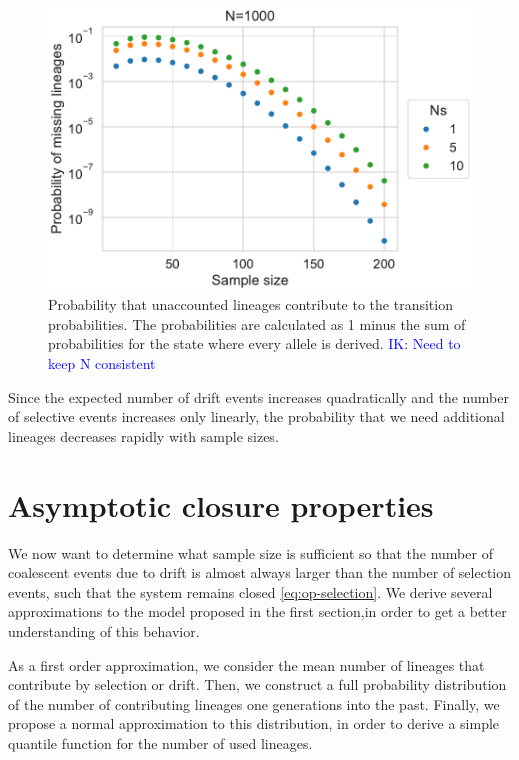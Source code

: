 \documentclass[review]{elsarticle}
\newcommand{\ikcomment}[1]{\textcolor{blue}{IK: #1}}
\begin{document}
\begin{figure}
  \centering
  \includegraphics[]{fig/missing.pdf}
  \caption{Probability that unaccounted lineages contribute to the transition probabilities. The
    probabilities are calculated as 1 minus the sum of probabilities for the state where every
    allele is derived. \ikcomment{Need to keep N consistent}}
  \label{fig:missing}
\end{figure}

Since the expected number of drift events increases quadratically and the number of selective events
increases only linearly, the probability that we need additional lineages decreases rapidly with
sample sizes.

\section{Asymptotic closure properties}

We now want to determine what sample size is sufficient so that the number of coalescent events due
to drift is almost always larger than the number of selection events, such that the system remains
closed \eqref{eq:op-selection}. We derive several approximations to the model proposed in the first
section,in order to get a better understanding of this behavior.

As a first order approximation, we consider the mean number of lineages that contribute by selection
or drift. Then, we construct a full probability distribution of the number of contributing lineages
one generations into the past. Finally, we propose a normal approximation to this distribution, in
order to derive a simple quantile function for the number of used lineages.
\end{document}
